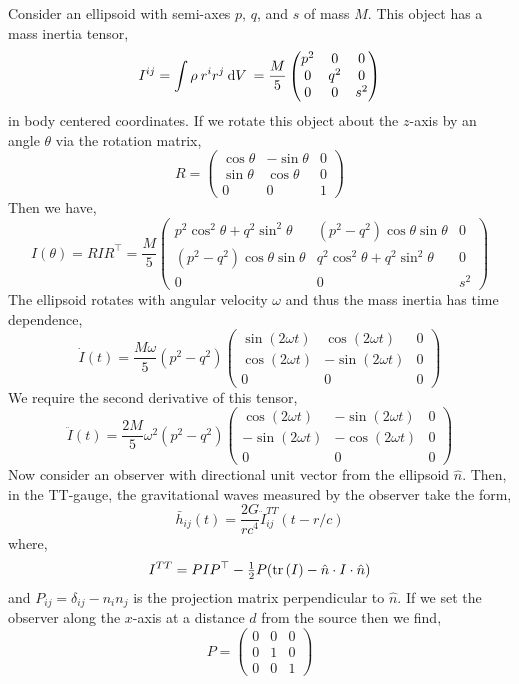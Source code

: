 \documentclass[12pt]{article}
\begin{document}
Consider an ellipsoid with semi-axes $p$, $q$, and $s$ of mass $M$. This object has a mass inertia tensor,
\[ I^{ij} = \int \rho \: r^i r^j \: \mathrm{d}V \: = \frac{M}{5} 
\begin{pmatrix}
p^2 & 0 & 0
\\
0 & q^2 & 0
\\
0 & 0 & s^2
\end{pmatrix} \]
in body centered coordinates. If we rotate this object about the $z$-axis by an angle $\theta$ via the rotation matrix,
\[ R = \begin{pmatrix}
\cos{\theta} & - \sin{\theta} & 0
\\
\sin{\theta} & \cos{\theta} & 0 
\\
0 & 0 & 1
\end{pmatrix}
\] 
Then we have,
\[ I(\theta) = R I R^\top = \frac{M}{5}
\begin{pmatrix}
p^2 \cos^2{\theta} + q^2 \sin^2{\theta} & (p^2 - q^2) \cos{\theta} \sin{\theta} & 0
\\
(p^2 - q^2) \cos{\theta} \sin{\theta} & q^2 \cos^2{\theta} + q^2 \sin^2{\theta} & 0 
\\
0 & 0 & s^2
\end{pmatrix} \]
The ellipsoid rotates with angular velocity $\omega$ and thus the mass inertia has time dependence,
\[ \dot{I}(t) = \frac{M \omega}{5} (p^2 - q^2)
\begin{pmatrix}
 \sin{(2 \omega t)} & \cos{(2 \omega t)} & 0
\\
\cos{(2 \omega t)} & -\sin{(2 \omega t)} & 0
\\
0 & 0 & 0
\end{pmatrix} \]
We require the second derivative of this tensor,
\[ \ddot{I}(t) = \frac{2 M}{5} \omega^2 (p^2 - q^2) 
\begin{pmatrix}
\cos{(2 \omega t)} & -\sin{(2 \omega t)} & 0
\\
-\sin{(2 \omega t)} & -\cos{(2 \omega t)} & 0
\\
0 & 0 & 0
\end{pmatrix} \]
Now consider an observer with directional unit vector from the ellipsoid $\hat{n}$. Then, in the TT-gauge, the gravitational waves measured by the observer take the form,
\[ \bar{h}_{ij}(t) = \frac{2 G}{r c^4} \ddot{I}_{ij}^{TT}(t - r / c) \]
where,
\[ I^{TT} = P I P^\top - \tfrac{1}{2} P (\mathrm{tr} \left( I \right) - \hat{n} \cdot I \cdot \hat{n}) \]
and $P_{ij} = \delta_{ij} - n_i n_j$ is the projection matrix perpendicular to $\hat{n}$. If we set the observer along the $x$-axis at a distance $d$ from the source then we find,
\[ P = \begin{pmatrix}
0 & 0 & 0
\\
0 & 1 & 0 
\\
0 & 0 & 1
\end{pmatrix} \]
\end{document}
